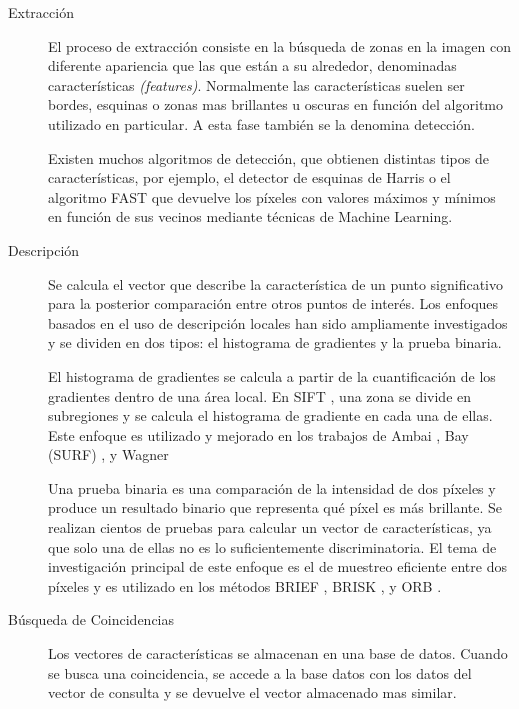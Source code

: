\begin{description}
\item[Extracción] El proceso de extracción consiste en la búsqueda de zonas en la imagen con diferente apariencia que las que están a su alrededor, denominadas características \emph{(features)}. Normalmente las características suelen ser bordes, esquinas o zonas mas brillantes u oscuras en función del algoritmo utilizado en particular. A esta fase también se la denomina detección.

  Existen muchos algoritmos de detección, que obtienen distintas tipos de características, por ejemplo, el detector de esquinas de Harris\cite{Harris} o el algoritmo FAST \cite{Rosten} que devuelve los píxeles con valores máximos y mínimos en función de sus vecinos mediante técnicas de Machine Learning.

\item[Descripción] Se calcula el vector que describe la característica de un punto significativo para la posterior comparación entre otros puntos de interés. Los enfoques basados en el uso de descripción locales han sido ampliamente investigados y se dividen en dos tipos: el histograma de gradientes y la prueba binaria.

  El histograma de gradientes se calcula a partir de la cuantificación de los gradientes dentro de una área local. En SIFT \cite{Lowe}, una zona se divide en subregiones y se calcula el histograma de gradiente en cada una de ellas. Este enfoque es utilizado y mejorado en los trabajos de Ambai \cite{Ambai}, Bay (SURF) \cite{Bay}, y Wagner \cite{Wagner}

  Una prueba binaria es una comparación de la intensidad de dos píxeles y produce un resultado binario que representa qué píxel es más brillante. Se realizan cientos de pruebas para calcular un vector de características, ya que solo una de ellas no es lo suficientemente discriminatoria. El tema de investigación principal de este enfoque es el de muestreo eficiente entre dos píxeles y es utilizado en los métodos BRIEF \cite{Calonder}, BRISK \cite{Leutenegger}, y ORB \cite{Rublee}. 

\item[Búsqueda de Coincidencias] Los vectores de características se almacenan en una base de datos. Cuando se busca una coincidencia, se accede a la base datos con los datos del vector de consulta y se devuelve el vector almacenado mas similar.


\end{description}
